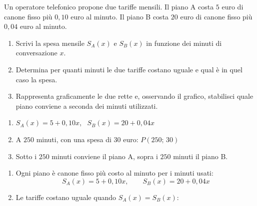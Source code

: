 \begin{question}[ID=4.3, subtitle={Confronto tra due piani telefonici}, difficulty=difficile, tags={sistemi, break-even, grafici}]
Un operatore telefonico propone due tariffe mensili. Il piano A costa $5$ euro di canone fisso più $0{,}10$ euro al minuto. Il piano B costa $20$ euro di canone fisso più $0{,}04$ euro al minuto.
\begin{enumerate}[label=\alph*),leftmargin=1.8cm]
    \item Scrivi la spesa mensile $S_A(x)$ e $S_B(x)$ in funzione dei minuti di conversazione $x$.
    \item Determina per quanti minuti le due tariffe costano uguale e qual è in quel caso la spesa.
    \item Rappresenta graficamente le due rette e, osservando il grafico, stabilisci quale piano conviene a seconda dei minuti utilizzati.
\end{enumerate}
\begin{solution}
\begin{enumerate}[label=\alph*),leftmargin=1.8cm]
    \item $S_A(x)=5+0{,}10x$, \ $S_B(x)=20+0{,}04x$
    \item A $250$ minuti, con una spesa di $30$ euro: $P(250;\,30)$
    \item Sotto i $250$ minuti conviene il piano A, sopra i $250$ minuti il piano B.
\begin{center}
\end{center}
\end{enumerate}
\end{solution}
\begin{explanation}
\begin{enumerate}[label=\alph*),leftmargin=1.8cm]
    \item Ogni piano è canone fisso più costo al minuto per i minuti usati:
    \[ S_A(x)=5+0{,}10x, \qquad S_B(x)=20+0{,}04x \]
    \item Le tariffe costano uguale quando $S_A(x)=S_B(x)$:

\end{enumerate}
\end{explanation}
\end{question}
